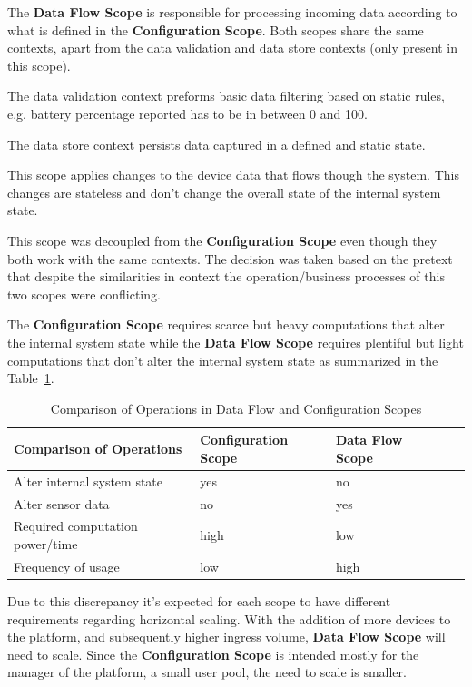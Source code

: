 The \textbf{Data Flow Scope} is responsible for processing incoming data according to what is defined in the \textbf{Configuration Scope}. Both scopes share the same contexts, apart from the data validation and data store contexts (only present in this scope).

The data validation context preforms basic data filtering based on static rules, e.g. battery percentage reported has to be in between 0 and 100.

The data store context persists data captured in a defined and static state.

This scope applies changes to the device data that flows though the system. This changes are stateless and don't change the overall state of the internal system state.

This scope was decoupled from the \textbf{Configuration Scope} even though they both work with the same contexts. The decision was taken based on the pretext that despite the similarities in context the operation/business processes of this two scopes were conflicting.

The \textbf{Configuration Scope} requires scarce but heavy computations that alter the internal system state while the \textbf{Data Flow Scope} requires plentiful but light computations that don't alter the internal system state as summarized in the Table~\ref{tab:design:system_scopes:data_flow_scope:comparison}.

\begin{table}[!ht]
   \caption[Comparison of Operations in Data Flow and Configuration Scopes]{Comparison of Operations in Data Flow and Configuration Scopes}
   \label{tab:design:system_scopes:data_flow_scope:comparison}
   \centering
   \begin{tabular}{@{}lllll@{}}
   \toprule
   \textbf{Comparison of Operations} & \textbf{Configuration Scope} & \textbf{Data Flow Scope} \\ \midrule
       Alter internal system state & yes & no \\ \hline
       Alter sensor data & no & yes \\ \hline
       Required computation power/time & high & low \\ \hline
       Frequency of usage & low & high \\ \hline
   \end{tabular}
\end{table}

Due to this discrepancy it's expected for each scope to have different requirements regarding horizontal scaling. With the addition of more devices to the platform, and subsequently higher ingress volume, \textbf{Data Flow Scope} will need to scale. Since the \textbf{Configuration Scope} is intended mostly for the manager of the platform, a small user pool, the need to scale is smaller.

